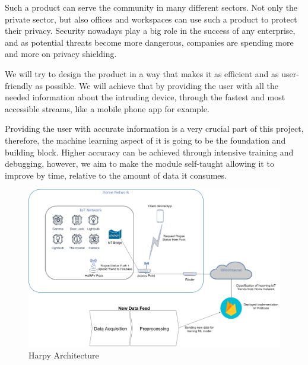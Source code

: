 \documentclass{article}
\begin{document}
Such a product can serve the community in many different sectors. Not only the private sector, but also offices and workspaces can use such a product to protect their privacy. Security nowadays  play a big role in the success of any enterprise, and as potential threats become more dangerous, companies are spending more and more on privacy shielding.\newline 

We will try to design the product in a way that makes it as efficient and as user-friendly as possible. We will achieve that by providing the user with all the needed information about the intruding device, through the fastest and most accessible streams, like a mobile phone app for example.\newline

Providing the user with accurate information is a very crucial part of this project, therefore, the machine learning aspect of it is going to be the foundation and building block. Higher accuracy can be achieved through intensive training and debugging, however, we aim to make the module self-taught allowing it to improve by time, relative to the amount of data it consumes.\newline
\begin{figure}[!ht]
    \centering
    \includegraphics[width=13cm]{harpyArchitecture.png}
    \caption{Harpy Architecture} 
\end{figure}
\end{document}

